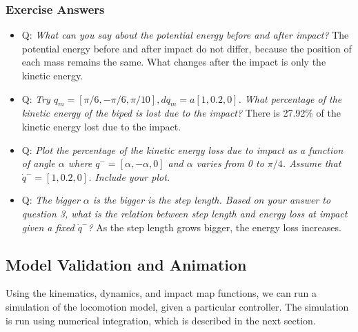 \subsubsection{Exercise Answers}
\begin{itemize}
\item Q: \emph{What can you say about the potential energy before and after impact?} 
The potential energy before and after impact do not differ, because the position of each mass remains the same. What changes after the impact is only the kinetic energy.
\item Q: \emph{Try $q_m = [\pi/6, -\pi/6, \pi/10], dq_m = a[1, 0.2, 0]$. What percentage of the kinetic energy of the biped is lost due to the impact?}  
There is 27.92\% of the kinetic energy lost due to the impact. 
\item Q: \emph{Plot the percentage of the kinetic energy loss due to impact as a function of angle $\alpha$ where $q^- = [\alpha, -\alpha, 0]$  and $\alpha$ varies from 0 to $\pi/4$. Assume that $\dot q^- = [1, 0.2, 0]$. Include your plot.}

\raggedright \item Q: \emph{The bigger $\alpha$ is the bigger is the step length. Based on your answer to question 3, what is the relation between step length and energy loss at impact given a fixed $\dot q^-$?}
As the step length grows bigger, the energy loss increases.    
\end{itemize}

\subsection{Model Validation and Animation}
\label{sec:validation}
Using the kinematics, dynamics, and impact map functions, we can run a simulation of the locomotion model, given a particular controller. The simulation is run using numerical integration, which is described in the next section. 
%
